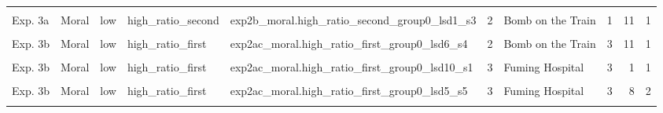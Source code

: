 \documentclass[
]{article}
\begin{document}
\begin{longtable}[t]{lllllrlrrr}
\endfoot
\bottomrule
\endlastfoot
\cellcolor{gray!10}{Exp. 3a} & \cellcolor{gray!10}{Moral} & \cellcolor{gray!10}{low} & \cellcolor{gray!10}{high\_ratio\_second} & \cellcolor{gray!10}{exp2b\_moral.high\_ratio\_second\_group0\_lsd1\_s5} & \cellcolor{gray!10}{4} & \cellcolor{gray!10}{Blitz} & \cellcolor{gray!10}{1} & \cellcolor{gray!10}{3} & \cellcolor{gray!10}{1}\\
Exp. 3a & Moral & low & high\_ratio\_second & exp2b\_moral.high\_ratio\_second\_group0\_lsd1\_s3 & 2 & Bomb on the Train & 1 & 11 & 1\\
\cellcolor{gray!10}{Exp. 3b} & \cellcolor{gray!10}{Moral} & \cellcolor{gray!10}{low} & \cellcolor{gray!10}{high\_ratio\_first} & \cellcolor{gray!10}{exp2ac\_moral.high\_ratio\_first\_group0\_lsd10\_s4} & \cellcolor{gray!10}{2} & \cellcolor{gray!10}{Bomb on the Train} & \cellcolor{gray!10}{3} & \cellcolor{gray!10}{10} & \cellcolor{gray!10}{1}\\
Exp. 3b & Moral & low & high\_ratio\_first & exp2ac\_moral.high\_ratio\_first\_group0\_lsd6\_s4 & 2 & Bomb on the Train & 3 & 11 & 1\\
\cellcolor{gray!10}{Exp. 3b} & \cellcolor{gray!10}{Moral} & \cellcolor{gray!10}{low} & \cellcolor{gray!10}{high\_ratio\_first} & \cellcolor{gray!10}{exp2ac\_moral.high\_ratio\_first\_group0\_lsd6\_s5} & \cellcolor{gray!10}{2} & \cellcolor{gray!10}{Bomb on the Train} & \cellcolor{gray!10}{3} & \cellcolor{gray!10}{11} & \cellcolor{gray!10}{1}\\
\addlinespace
Exp. 3b & Moral & low & high\_ratio\_first & exp2ac\_moral.high\_ratio\_first\_group0\_lsd10\_s1 & 3 & Fuming Hospital & 3 & 1 & 1\\
\cellcolor{gray!10}{Exp. 3b} & \cellcolor{gray!10}{Moral} & \cellcolor{gray!10}{low} & \cellcolor{gray!10}{high\_ratio\_first} & \cellcolor{gray!10}{exp2ac\_moral.high\_ratio\_first\_group0\_lsd5\_s2} & \cellcolor{gray!10}{3} & \cellcolor{gray!10}{Fuming Hospital} & \cellcolor{gray!10}{3} & \cellcolor{gray!10}{9} & \cellcolor{gray!10}{2}\\
Exp. 3b & Moral & low & high\_ratio\_first & exp2ac\_moral.high\_ratio\_first\_group0\_lsd5\_s5 & 3 & Fuming Hospital & 3 & 8 & 2\\
\cellcolor{gray!10}{Exp. 3b} & \cellcolor{gray!10}{Moral} & \cellcolor{gray!10}{low} & \cellcolor{gray!10}{high\_ratio\_first} & \cellcolor{gray!10}{exp2ac\_moral.high\_ratio\_first\_group0\_lsd4\_s1} & \cellcolor{gray!10}{6} & \cellcolor{gray!10}{Space Supplies} & \cellcolor{gray!10}{2} & \cellcolor{gray!10}{7} & \cellcolor{gray!10}{1}\\

\end{longtable}
\end{document}
